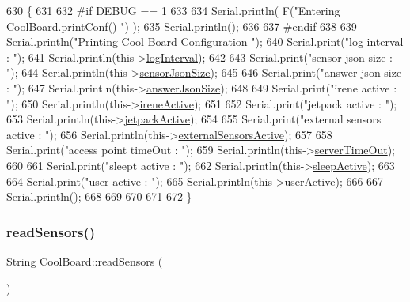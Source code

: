 \begin{DoxyCode}
630 \{
631 
632 \textcolor{preprocessor}{#if DEBUG == 1}
633     
634     Serial.println( F(\textcolor{stringliteral}{"Entering CoolBoard.printConf() "}) );
635     Serial.println();
636 
637 \textcolor{preprocessor}{#endif}
638 
639     Serial.println(\textcolor{stringliteral}{"Printing Cool Board Configuration "});
640     Serial.print(\textcolor{stringliteral}{"log interval      : "});
641     Serial.println(this->\hyperlink{classCoolBoard_a4de0096d575d66b472c4c1f0111fd452}{logInterval});
642 
643     Serial.print(\textcolor{stringliteral}{"sensor json size      : "});
644     Serial.println(this->\hyperlink{classCoolBoard_a58e4b6072e3ac8b141ec0befb479208e}{sensorJsonSize});
645 
646     Serial.print(\textcolor{stringliteral}{"answer json size      : "});
647     Serial.println(this->\hyperlink{classCoolBoard_af2da1f85315b3d074a8b87d158094fb7}{answerJsonSize});
648 
649     Serial.print(\textcolor{stringliteral}{"irene active      : "});
650     Serial.println(this->\hyperlink{classCoolBoard_a9c3f7ac625481ee2ae802a25d97a4ae0}{ireneActive});
651 
652     Serial.print(\textcolor{stringliteral}{"jetpack active        : "});
653     Serial.println(this->\hyperlink{classCoolBoard_a9be03a913d26e558328935ca3b59a75e}{jetpackActive});
654 
655     Serial.print(\textcolor{stringliteral}{"external sensors active   : "});
656     Serial.println(this->\hyperlink{classCoolBoard_a638b00b76aeb819ecfd4c10b8cdd7bb7}{externalSensorsActive});
657 
658     Serial.print(\textcolor{stringliteral}{"access point timeOut  : "});
659     Serial.println(this->\hyperlink{classCoolBoard_a7a8d8d3d316220cdd049cd63c1aa8fe6}{serverTimeOut});
660 
661     Serial.print(\textcolor{stringliteral}{"sleept active         : "});
662     Serial.println(this->\hyperlink{classCoolBoard_a0a51b2287139f66c738101fb53139230}{sleepActive});
663 
664     Serial.print(\textcolor{stringliteral}{"user active       : "});
665     Serial.println(this->\hyperlink{classCoolBoard_a6395459131d6889a3005f79c7a35e964}{userActive});
666 
667     Serial.println();
668 
669 
670 
671 
672 \}
\end{DoxyCode}
\mbox{\label{classCoolBoard_ad03abdce2e65f520bbf2cff0f2d083cf}} 
\subsubsection{\texorpdfstring{read\+Sensors()}{readSensors()}}
{\footnotesize\ttfamily String Cool\+Board\+::read\+Sensors (\begin{DoxyParamCaption}{ }\end{DoxyParamCaption})}


